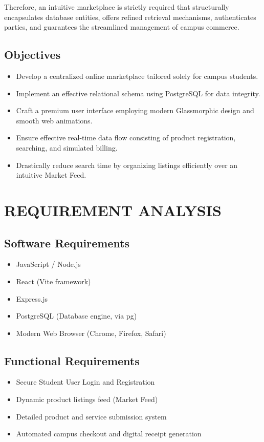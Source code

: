 \documentclass[a4paper,12pt]{report}
\begin{document}
Therefore, an intuitive marketplace is strictly required that structurally encapsulates database entities, offers refined retrieval mechanisms, authenticates parties, and guarantees the streamlined management of campus commerce.

\section{Objectives}

\begin{itemize}
\item Develop a centralized online marketplace tailored solely for campus students.
\item Implement an effective relational schema using PostgreSQL for data integrity.
\item Craft a premium user interface employing modern Glassmorphic design and smooth web animations.
\item Ensure effective real-time data flow consisting of product registration, searching, and simulated billing.
\item Drastically reduce search time by organizing listings efficiently over an intuitive Market Feed.
\end{itemize}

\chapter{REQUIREMENT ANALYSIS}

\section{Software Requirements}
\begin{itemize}
\item JavaScript / Node.js
\item React (Vite framework)
\item Express.js 
\item PostgreSQL (Database engine, via pg)
\item Modern Web Browser (Chrome, Firefox, Safari)
\end{itemize}

\section{Functional Requirements}
\begin{itemize}
\item Secure Student User Login and Registration 
\item Dynamic product listings feed (Market Feed)
\item Detailed product and service submission system
\item Automated campus checkout and digital receipt generation
\end{itemize}
\end{document}
